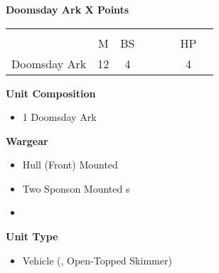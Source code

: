 \newpage
\subsubsection[Doomsday Ark]{}
\hspace{0.5em}
\begin{minipage}[t]{0.72\textwidth}
	{\large \textbf{Doomsday Ark \dotfill X Points}}
	\begin{NiceTabular}{m{145 pt} *{2}{c} | *{3}{c} | c | c }
		& & &  & & & &  \\
		& M & BS &  &  &  & HP &  \\
		\hline
		Doomsday Ark & 12 & 4 &  &  &  & 4 & \\
	\end{NiceTabular}
	\small
	\begin{minipage}[t]{0.5\textwidth}
		\begin{flushleft}
			\vspace*{2em}
			\textbf{Unit Composition}
			\begin{itemize}
				\item 1 Doomsday Ark
			\end{itemize}
			
			\textbf{Wargear}
			\begin{itemize}
				\item Hull (Front) Mounted 
				\item Two Sponson Mounted s
				\item {}
			\end{itemize}
		\end{flushleft}
	\end{minipage}
	\begin{minipage}[t]{0.5\textwidth}
		\begin{flushleft}
			\vspace*{2em}
			\textbf{Unit Type}
			\begin{itemize}
				\item Vehicle (, Open-Topped Skimmer)
			\end{itemize}
			

\end{flushleft}
\end{minipage}
\end{minipage}
